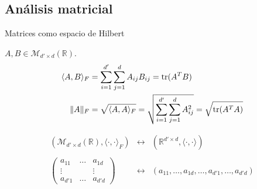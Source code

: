 \documentclass[10pt, compress]{beamer}
\newcommand\R{\mathbb{R}}
\begin{document}
\subsection{Análisis matricial}

\begin{frame}{Matrices como espacio de Hilbert}
  \begin{definition}
  $A, B \in \mathcal{M}_{d'\times d}(\R)$.
    \begin{align*}
      \langle A, B \rangle_F &= \sum_{i=1}^{d'} \sum_{j=1}^{d} A_{ij}B_{ij} = \operatorname{tr}(A^TB)  \\
      \|A\|_F &= \sqrt{\langle A, A \rangle_F} = \sqrt{\sum_{i=1}^{d'} \sum_{j=1}^{d} A_{ij}^2} = \sqrt{\operatorname{tr}(A^TA)}
    \end{align*}
  \end{definition}

  \begin{equation*}
    \begin{matrix}
      \left(\mathcal{M}_{d' \times d}(\R), \langle \cdot, \cdot \rangle_F\right) & \longleftrightarrow & \left(\R^{d' \times d}, \langle \cdot, \cdot \rangle \right) \\
      & & \\
      \begin{pmatrix}
        a_{11} & \dots & a_{1d} \\
        \vdots & & \vdots \\
        a_{d'1} & \dots & a_{d'd}
      \end{pmatrix} & \longleftrightarrow & (a_{11},\dots,a_{1d}, \dots, a_{d'1},\dots,a_{d'd})
    \end{matrix}
  \end{equation*}
\end{frame}
\end{document}
